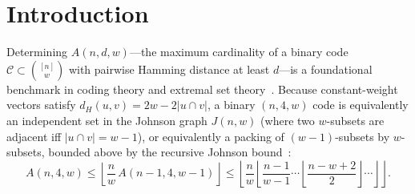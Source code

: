 \documentclass[11pt,letterpaper]{article}
\theoremstyle{plain}
\theoremstyle{definition}
\theoremstyle{remark}
\begin{document}
\begin{abstract}
We construct and exhaustively verify, with two independent implementations, \textbf{thirty-six (36) improved lower bounds} strictly exceeding the live November~24, 2026 (\texttt{22:50 CET}) Brouwer table across $24 \le n \le 30$ and $7 \le w \le 15$, improving \textbf{every listed cell at $n = 30$ ($w = 7..15$)} and \textbf{every listed cell at $n = 25$ ($w = 7..12$)}. The underlying construction theorem is mechanized in \textbf{Lean~4.33.0} ($0$ Mathlib dependencies, $0$ \texttt{sorry}, $0$ custom axioms); the existence of the $36$ specific codes is established by exhaustive computation, not by Lean. Across all $36$ cells, our compact archive of $20$ new component certificates ($\approx 360\,\mathrm{KB}$) deterministically generates \textbf{$38{,}467{,}121$ explicit binary codewords} adding \textbf{$+16{,}697$ new codewords} (peaking at $A(30,4,15) \ge 5{,}699{,}800$, $+2{,}720$). Every code is exhaustively verified with \textbf{zero $(w{-}1)$-subset collisions across all $486{,}375{,}836$ subtuples} (proving $d_H \ge 4$ over all $5.946 \times 10^{13}$ pairs), direct $O(M^2)$ brute-force checking across \textbf{$7{,}300{,}834{,}283$ pairs} on five raw hex files, and \textbf{$36/36$ byte-for-byte SHA-256 parity} between compiled Go and an independent zero-shared-code pure-Python verifier (composite SHA-256 \texttt{ff6475f8763defd1...}).
\end{abstract}

\section{Introduction}
\label{sec:intro}

Determining $A(n, d, w)$---the maximum cardinality of a binary code $\mathcal{C} \subset \binom{[n]}{w}$ with pairwise Hamming distance at least $d$---is a foundational benchmark in coding theory and extremal set theory~\cite{Johnson1962,GrahamSloane1980,BSSS1990}. Because constant-weight vectors satisfy $d_H(u, v) = 2w - 2|u \cap v|$, a binary $(n, 4, w)$ code is equivalently an independent set in the Johnson graph $J(n, w)$ (where two $w$-subsets are adjacent iff $|u \cap v| = w - 1$), or equivalently a packing of $(w{-}1)$-subsets by $w$-subsets, bounded above by the recursive Johnson bound~\cite{Johnson1962}:
\begin{equation}
\label{eq:johnson}
A(n, 4, w) \le \left\lfloor \frac{n}{w}\, A(n-1, 4, w-1) \right\rfloor \le \left\lfloor \frac{n}{w} \left\lfloor \frac{n-1}{w-1} \cdots \left\lfloor \frac{n-w+2}{2} \right\rfloor \cdots \right\rfloor \right\rfloor.
\end{equation}
\end{document}
